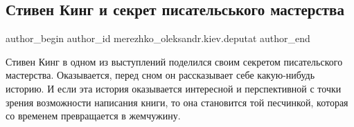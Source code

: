 
 
 
 
 
 
\subsection{Стивен Кинг и секрет писательського мастерства}
\label{sec:27_11_2021.fb.merezhko_oleksandr.kiev.deputat.1.stiven_king}
 
\ifcmt
 author_begin
   author_id merezhko_oleksandr.kiev.deputat
 author_end
\fi

Стивен Кинг в одном из выступлений поделился своим секретом писательского
мастерства. Оказывается, перед сном он рассказывает себе какую-нибудь историю.
И если эта история оказывается интересной и перспективной с точки зрения
возможности написания книги, то она становится той песчинкой, которая со
временем превращается в жемчужину.
